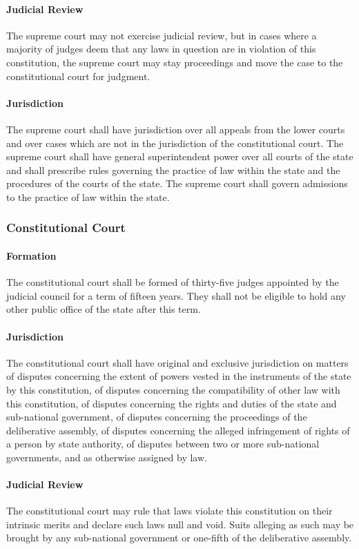 \documentclass{article}
\begin{document}
\paragraph{Judicial Review}
The supreme court may not exercise judicial review, but in cases where a majority of judges deem that any laws in question are in violation of this constitution, the supreme court may stay proceedings and move the case to the constitutional court for judgment.
\paragraph{Jurisdiction}
The supreme court shall have jurisdiction over all appeals from the lower courts and over cases which are not in the jurisdiction of the constitutional court. The supreme court shall have general superintendent power over all courts of the state and shall prescribe rules governing the practice of law within the state and the procedures of the courts of the state. The supreme court shall govern admissions to the practice of law within the state.
\subsubsection{Constitutional Court}
\paragraph{Formation}
The constitutional court shall be formed of thirty-five judges appointed by the judicial council for a term of fifteen years. They shall not be eligible to hold any other public office of the state after this term.
\paragraph{Jurisdiction}
The constitutional court shall have original and exclusive jurisdiction on matters of disputes concerning the extent of powers vested in the instruments of the state by this constitution, of disputes concerning the compatibility of other law with this constitution, of disputes concerning the rights and duties of the state and sub-national government, of disputes concerning the proceedings of the deliberative assembly, of disputes concerning the alleged infringement of rights of a person by state authority, of disputes between two or more sub-national governments, and as otherwise assigned by law.
\paragraph{Judicial Review}
The constitutional court may rule that laws violate this constitution on their intrinsic merits and declare such laws null and void. Suits alleging as such may be brought by any sub-national government or one-fifth of the deliberative assembly. 
\end{document}
